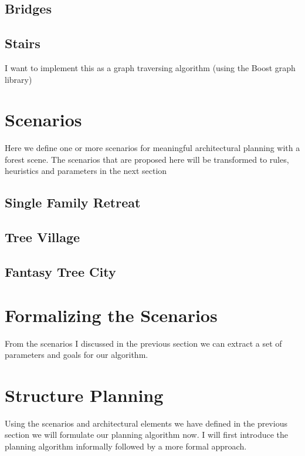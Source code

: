 \subsection{Bridges}
\label{sec:bridges}
 

\subsection{Stairs}
\label{sec:stairs}
  
 


 I want to implement this as a graph traversing algorithm
 (using the Boost graph library)
 
 
\section{Scenarios}
\label{sec:scenarios}

Here we define one or more scenarios for meaningful architectural planning with a forest scene.
The scenarios that are proposed here will be transformed to rules, heuristics and parameters in 
the next section 
	
	
\subsection{Single Family Retreat}
\subsection{Tree Village}
\subsection{Fantasy Tree City}


\section{Formalizing the Scenarios}

From the scenarios I discussed in the previous section we can extract a set of parameters and goals for our algorithm.
 
\section{Structure Planning}
\label{sec:PlanningAlgorithm} 
  
 Using the scenarios and architectural elements we have defined in the previous section we will formulate our planning algorithm now.
 I will first introduce the planning algorithm informally followed by a more formal approach.
      
